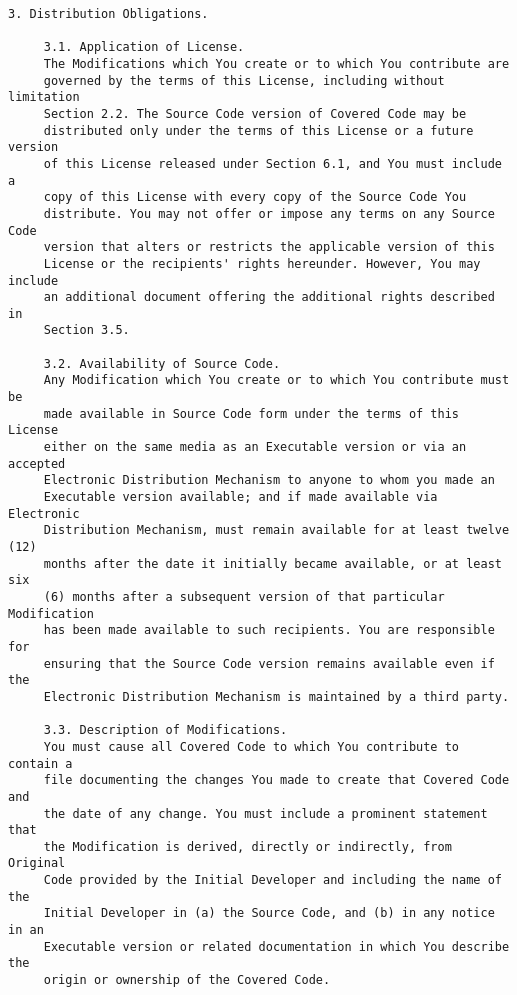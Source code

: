 \begin{verbatim}
3. Distribution Obligations.

     3.1. Application of License.
     The Modifications which You create or to which You contribute are
     governed by the terms of this License, including without limitation
     Section 2.2. The Source Code version of Covered Code may be
     distributed only under the terms of this License or a future version
     of this License released under Section 6.1, and You must include a
     copy of this License with every copy of the Source Code You
     distribute. You may not offer or impose any terms on any Source Code
     version that alters or restricts the applicable version of this
     License or the recipients' rights hereunder. However, You may include
     an additional document offering the additional rights described in
     Section 3.5.

     3.2. Availability of Source Code.
     Any Modification which You create or to which You contribute must be
     made available in Source Code form under the terms of this License
     either on the same media as an Executable version or via an accepted
     Electronic Distribution Mechanism to anyone to whom you made an
     Executable version available; and if made available via Electronic
     Distribution Mechanism, must remain available for at least twelve (12)
     months after the date it initially became available, or at least six
     (6) months after a subsequent version of that particular Modification
     has been made available to such recipients. You are responsible for
     ensuring that the Source Code version remains available even if the
     Electronic Distribution Mechanism is maintained by a third party.

     3.3. Description of Modifications.
     You must cause all Covered Code to which You contribute to contain a
     file documenting the changes You made to create that Covered Code and
     the date of any change. You must include a prominent statement that
     the Modification is derived, directly or indirectly, from Original
     Code provided by the Initial Developer and including the name of the
     Initial Developer in (a) the Source Code, and (b) in any notice in an
     Executable version or related documentation in which You describe the
     origin or ownership of the Covered Code.


\end{verbatim}
